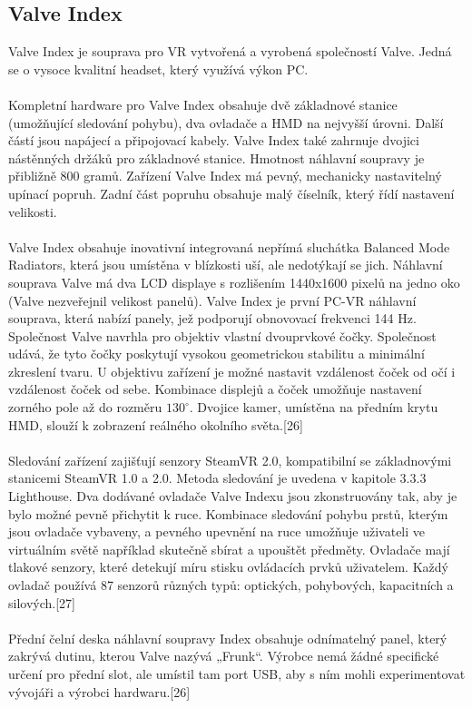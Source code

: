 \documentclass[a4paper, 12pt]{report}
\begin{document}
\subsection{Valve Index}
Valve Index je souprava pro VR vytvořená a vyrobená společností Valve. Jedná se o vysoce kvalitní headset, který využívá výkon PC.\\
\\
Kompletní hardware pro Valve Index obsahuje dvě základnové stanice (umožňující sledování pohybu), dva ovladače a HMD na nejvyšší úrovni. Další částí jsou napájecí a připojovací kabely. Valve Index také zahrnuje dvojici nástěnných držáků pro základnové stanice. Hmotnost náhlavní soupravy je přibližně 800 gramů. Zařízení Valve Index má pevný, mechanicky nastavitelný upínací popruh. Zadní část popruhu obsahuje malý číselník, který řídí nastavení velikosti.\\
\\
Valve Index obsahuje inovativní integrovaná nepřímá sluchátka Balanced Mode Radiators, která jsou umístěna v blízkosti uší, ale nedotýkají se jich. Náhlavní souprava Valve má dva LCD displaye s rozlišením 1440x1600 pixelů na jedno oko (Valve nezveřejnil velikost panelů). Valve Index je první PC-VR náhlavní souprava, která nabízí panely, jež podporují obnovovací frekvenci 144 Hz. Společnost Valve navrhla pro objektiv vlastní dvouprvkové čočky. Společnost udává, že tyto čočky poskytují vysokou geometrickou stabilitu a minimální zkreslení tvaru. U objektivu zařízení je možné nastavit vzdálenost čoček od očí i vzdálenost čoček od sebe. Kombinace displejů a čoček umožňuje nastavení zorného pole až do rozměru $130^\circ$. Dvojice kamer, umístěna na předním krytu HMD, slouží k zobrazení reálného okolního světa.[26]\\
\\
Sledování zařízení zajišťují senzory SteamVR 2.0, kompatibilní se základnovými stanicemi SteamVR 1.0 a 2.0. Metoda sledování je uvedena v kapitole 3.3.3 Lighthouse. Dva dodávané ovladače Valve Indexu jsou zkonstruovány tak, aby je bylo možné pevně přichytit k ruce. Kombinace sledování pohybu prstů, kterým jsou ovladače vybaveny, a pevného upevnění na ruce umožňuje uživateli ve virtuálním světě například skutečně sbírat a upouštět předměty. Ovladače mají tlakové senzory, které detekují míru stisku ovládacích prvků uživatelem. Každý ovladač používá 87 senzorů různých typů: optických, pohybových, kapacitních a silových.[27]
\\
\\
Přední čelní deska náhlavní soupravy Index obsahuje odnímatelný panel, který zakrývá dutinu, kterou Valve nazývá „Frunk“. Výrobce nemá žádné specifické určení pro přední slot, ale umístil tam port USB, aby s ním mohli experimentovat vývojáři a výrobci hardwaru.[26]
 
\end{document}
